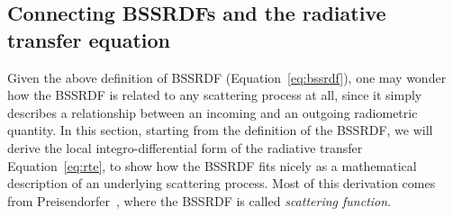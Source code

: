 \subsection{Connecting BSSRDFs and the radiative transfer equation}

Given the above definition of BSSRDF (Equation~\ref{eq:bssrdf}), one may wonder how the BSSRDF is related to any scattering process at all, since it simply describes a relationship between an incoming and an outgoing radiometric quantity. In this section, starting from the definition of the BSSRDF, we will derive the local integro-differential form of the radiative transfer Equation~\ref{eq:rte}, to show how the BSSRDF fits nicely as a mathematical description of an underlying scattering process. Most of this derivation comes from Preisendorfer~\cite{Preisendorfer1965,Preisendorfer76}, where the BSSRDF is called \emph{scattering function}.

